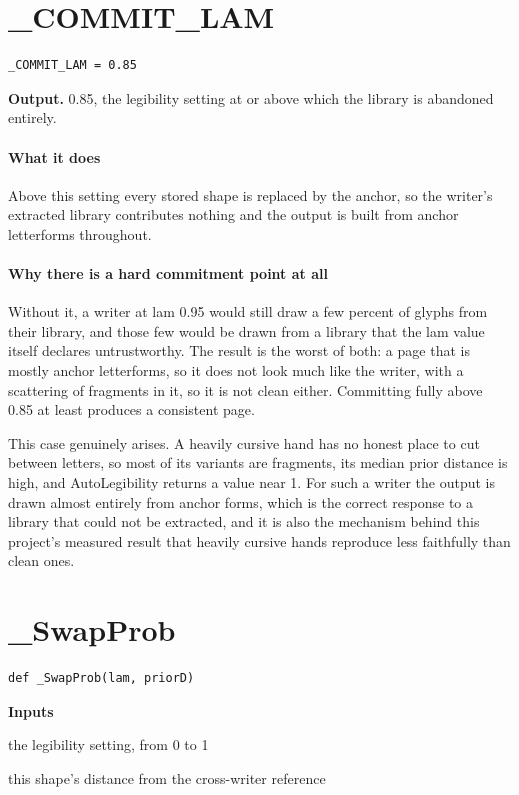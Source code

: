 \section{\_COMMIT\_LAM}
\begin{lstlisting}[style=sig]
_COMMIT_LAM = 0.85
\end{lstlisting}

\noindent\textbf{Output.} 0.85, the legibility setting at or above which the library is abandoned entirely.


\paragraph{What it does}
Above this setting every stored shape is replaced by the anchor, so the writer's extracted library contributes nothing and the output is built from anchor letterforms throughout.


\paragraph{Why there is a hard commitment point at all}
Without it, a writer at lam 0.95 would still draw a few percent of glyphs from their library, and those few would be drawn from a library that the lam value itself declares untrustworthy. The result is the worst of both: a page that is mostly anchor letterforms, so it does not look much like the writer, with a scattering of fragments in it, so it is not clean either. Committing fully above 0.85 at least produces a consistent page.

This case genuinely arises. A heavily cursive hand has no honest place to cut between letters, so most of its variants are fragments, its median prior distance is high, and AutoLegibility returns a value near 1. For such a writer the output is drawn almost entirely from anchor forms, which is the correct response to a library that could not be extracted, and it is also the mechanism behind this project's measured result that heavily cursive hands reproduce less faithfully than clean ones.


\section{\_SwapProb}
\begin{lstlisting}[style=sig]
def _SwapProb(lam, priorD)
\end{lstlisting}

\noindent\textbf{Inputs}
\begin{description}[leftmargin=2.2em,style=nextline,font=\normalfont\ttfamily]\setlength\itemsep{1pt}
  \item[{lam}] \normalfont the legibility setting, from 0 to 1
  \item[{priorD}] \normalfont this shape's distance from the cross-writer reference
\end{description}

